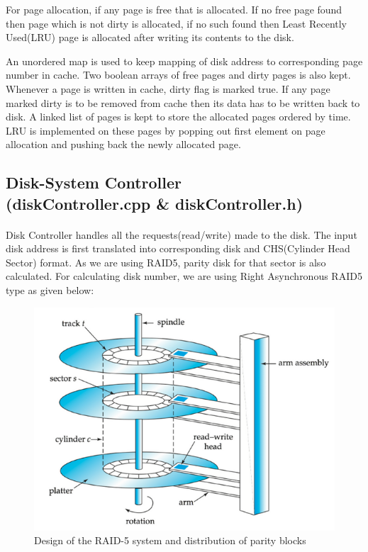 \documentclass[11pt]{article}
\begin{document}
For page allocation, if any page is free that is allocated. If no free page found then page which is not dirty is allocated, if no such found then Least Recently Used(LRU) page is allocated after writing its contents to the disk.


An unordered map is used to keep mapping of disk address to corresponding page number in cache. Two boolean arrays of free pages and dirty pages is also kept. Whenever a page is written in cache, dirty flag is marked true. If any page marked dirty is to be removed from cache then its data has to be written back to disk. A linked list of pages is kept to store the allocated pages ordered by time. LRU is implemented on these pages by popping out first element on page allocation and pushing back the newly allocated page.


\subsection{Disk-System Controller \\ (diskController.cpp \& diskController.h)}
\paragraph{}
Disk Controller handles all the requests(read/write) made to the disk. The input disk address is first translated into corresponding disk and CHS(Cylinder Head Sector) format. As we are using RAID5, parity disk for that sector is also calculated. For calculating disk number, we are using Right Asynchronous RAID5 type as given below:


\begin{figure}[ht!]
\center
\includegraphics[scale = 0.70]{images/disk.png}
\caption{Design of the RAID-5 system and distribution of parity blocks}
\label{overflow}
\end{figure}
\end{document}
